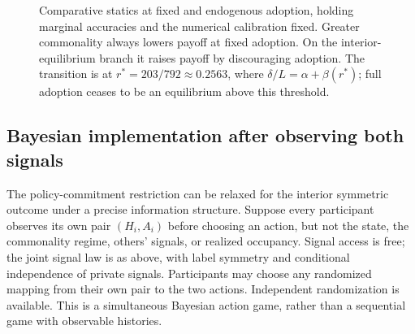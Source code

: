 \documentclass[11pt,a4paper]{article}
\theoremstyle{definition}
\theoremstyle{remark}
\begin{document}
\begin{figure}[tb]
\centering
{}
\caption{Comparative statics at fixed and endogenous adoption, holding marginal accuracies and the numerical calibration fixed. Greater commonality always lowers payoff at fixed adoption. On the interior-equilibrium branch it raises payoff by discouraging adoption. The transition is at $r^*=203/792\approx0.2563$, where $\delta/L=\alpha+\beta(r^*)$; full adoption ceases to be an equilibrium above this threshold.}\label{fig:commonality}
\end{figure}

\subsection{Bayesian implementation after observing both signals}
The policy-commitment restriction can be relaxed for the interior symmetric outcome under a precise information structure. Suppose every participant observes its own pair $(H_i,A_i)$ before choosing an action, but not the state, the commonality regime, others' signals, or realized occupancy. Signal access is free; the joint signal law is as above, with label symmetry and conditional independence of private signals. Participants may choose any randomized mapping from their own pair to the two actions. Independent randomization is available. This is a simultaneous Bayesian action game, rather than a sequential game with observable histories.
\end{document}
